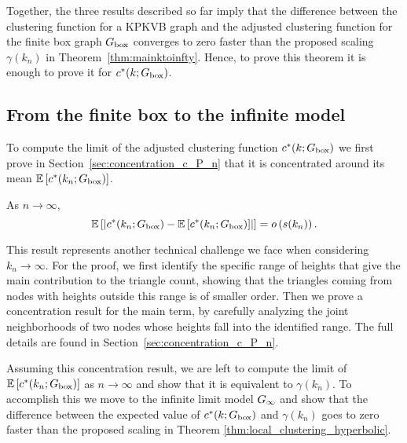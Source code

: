 Together, the three results described so far imply that the difference between the clustering function for a KPKVB graph and the adjusted clustering function for the finite box graph $G_{\text{box}}$ converges to zero faster than the proposed scaling $\gamma(k_n)$ in Theorem~\ref{thm:mainktoinfty}. Hence, to prove this theorem it is enough to prove it for $c^\ast(k; G_{\text{box}})$. 

\subsection{From the finite box to the infinite model}

To compute the limit of the adjusted clustering function $c^\ast(k; G_{\text{box}})$ we first prove in Section~\ref{sec:concentration_c_P_n} that it is concentrated around its mean $\mathbb{E}\left[c^\ast(k_n; G_{\text{box}})\right]$.


\begin{proposition}\label{prop:concentration_local_clustering_P_n}
As $n \to \infty$,
\[
	\mathbb{E}\left[\left|c^\ast(k_n; G_{\text{box}}) - \mathbb{E}\left[c^\ast(k_n; G_{\text{box}})\right]\right|\right] = o\left(s(k_n)\right).
\]
\end{proposition}

This result represents another technical challenge we face when considering $k_n \to \infty$. For the proof, we first identify the specific range of heights that give the main contribution to the triangle count, showing that the triangles coming from nodes with heights outside this range is of smaller order. Then we prove a concentration result for the main term, by carefully analyzing the joint neighborhoods of two nodes whose heights fall into the identified range. The full details are found in Section~\ref{sec:concentration_c_P_n}.

Assuming this concentration result, we are left to compute the limit of $\mathbb{E}\left[c^\ast(k_n; G_{\text{box}})\right]$ as $n \to \infty$ and show that it is equivalent to $\gamma(k_n)$. To accomplish this we move to the infinite limit model $G_{\infty}$ and show that the difference between the expected value of $c^\ast(k;G_{\text{box}})$ and $\gamma(k_n)$ goes to zero faster than the proposed scaling in Theorem \ref{thm:local_clustering_hyperbolic}.

